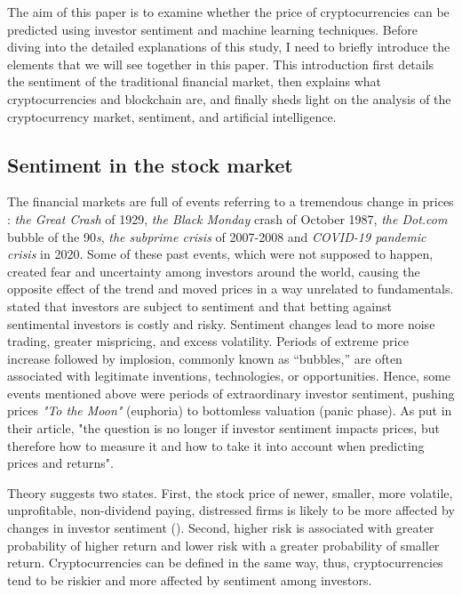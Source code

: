 \documentclass{article}
\begin{document}
	The aim of this paper is to examine whether the price of cryptocurrencies can be predicted using investor sentiment and machine learning techniques. Before diving into the detailed explanations of this study, I need to briefly introduce the elements that we will see together in this paper. This introduction first details the sentiment of the traditional financial market, then explains what cryptocurrencies and blockchain are, and finally sheds light on the analysis of the cryptocurrency market, sentiment, and artificial intelligence.
	
	\subsection{Sentiment in the stock market}
	
	The financial markets are full of events referring to a tremendous change in prices : \textit{the Great Crash} of 1929, \textit{the Black Monday} crash of October 1987, \textit{the Dot.com} bubble of the 90\textit{s}, \textit{the subprime crisis} of 2007-2008 and \textit{COVID-19 pandemic crisis} in 2020. Some of these past events, which were not supposed to happen, created fear and uncertainty among investors around the world, causing the opposite effect of the trend and moved prices in a way unrelated to fundamentals. \cite{ntrif} stated that investors are subject to sentiment and that betting against sentimental investors is costly and risky. Sentiment changes lead to more noise trading, greater
	mispricing, and excess volatility. Periods of extreme price increase followed by implosion, commonly known as “bubbles,” are often associated with legitimate inventions, technologies, or opportunities. Hence, some events mentioned above were periods of extraordinary investor sentiment, pushing prices \textit{"To the Moon"} (euphoria) to bottomless valuation (panic phase). As \cite{isits} put in their article, "the question is no longer if investor sentiment impacts prices, but therefore how to measure it and how to take it into account when predicting prices and returns". 
	
	Theory suggests two states. First, the stock price of newer, smaller, more volatile, unprofitable, non-dividend paying, distressed firms is likely to be more affected by changes in investor sentiment (\cite{isits}). Second, higher risk is associated with greater probability of higher return and lower risk with a greater probability of smaller return. Cryptocurrencies can be defined in the same way, thus, cryptocurrencies tend to be riskier and more affected by sentiment among investors.
	
\end{document}
